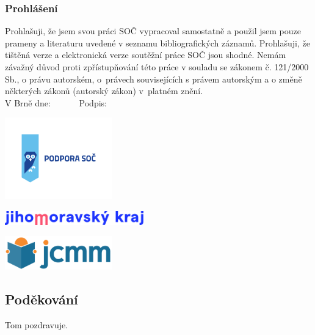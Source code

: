 \documentclass[12pt]{report}
\begin{document}
\newpage
\thispagestyle{empty}
\vspace*{14cm}
\subsubsection*{Prohlášení}

Prohlašuji, že jsem svou práci SOČ vypracoval samostatně a použil jsem pouze prameny a literaturu uvedené v seznamu bibliografických záznamů.
Prohlašuji, že tištěná verze a elektronická verze soutěžní práce SOČ jsou shodné. 
Nemám závažný důvod proti zpřístupňování této práce v souladu se zákonem č. 121/2000 Sb., o právu autorském, o~právech souvisejících s právem autorským a o změně některých zákonů (autorský zákon) v~platném znění. \\[1cm]
V Brně dne: \dotfill \ \ \ \ \ \  Podpis: \dotfill

\newpage
\thispagestyle{empty}
\begin{center}
\includegraphics[width=0.35\textwidth]{podpora_soc-horizontalni.png}
\end{center}
\vspace*{1.5cm}
\begin{center}
\includegraphics[width=0.45\textwidth]{logo_JMK_pruhledne.png}
\end{center}
\vspace*{2.2cm}
\begin{center}
\includegraphics[width=0.35\textwidth]{jcmm-logotype-positive1.png}
\end{center}
\vspace*{6.5cm}
\subsection*{Poděkování}
Tom pozdravuje.


\newpage
\thispagestyle{empty}
\end{document}
